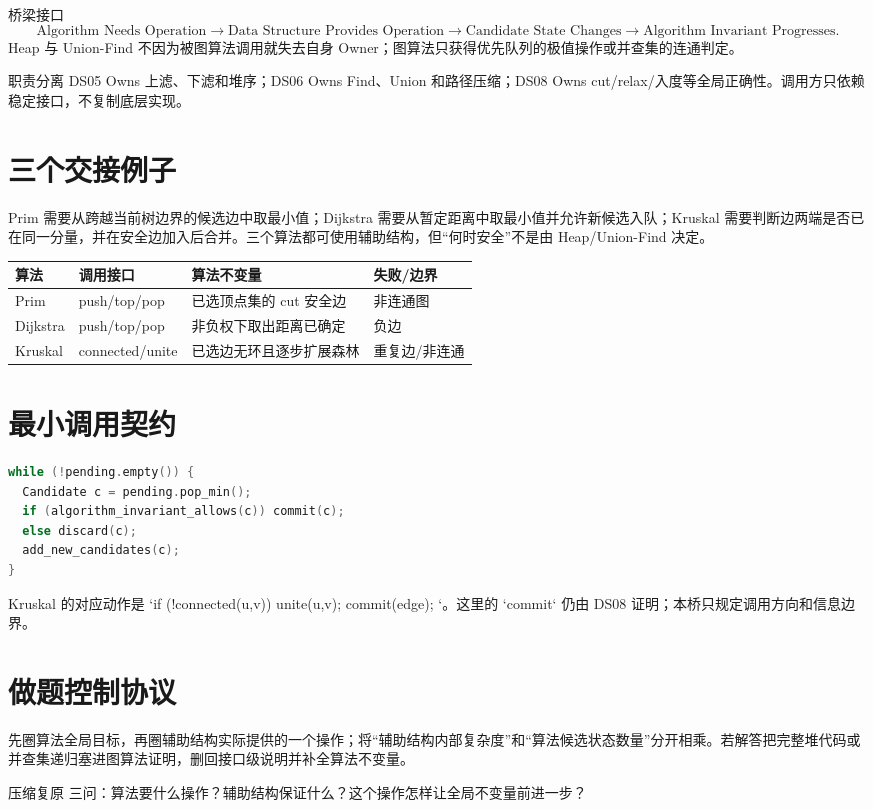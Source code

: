 \documentclass[UTF8,fontset=none,11pt,a4paper]{ctexart}
\begin{document}

\begin{corebox}{桥梁接口}
\[
\text{Algorithm Needs Operation}\to\text{Data Structure Provides Operation}\to\text{Candidate State Changes}\to\text{Algorithm Invariant Progresses}.
\]
Heap 与 Union-Find 不因为被图算法调用就失去自身 Owner；图算法只获得优先队列的极值操作或并查集的连通判定。
\end{corebox}
\begin{methodbox}{职责分离}
DS05 Owns 上滤、下滤和堆序；DS06 Owns Find、Union 和路径压缩；DS08 Owns cut/relax/入度等全局正确性。调用方只依赖稳定接口，不复制底层实现。
\end{methodbox}
\tableofcontents\newpage

\section{三个交接例子}
Prim 需要从跨越当前树边界的候选边中取最小值；Dijkstra 需要从暂定距离中取最小值并允许新候选入队；Kruskal 需要判断边两端是否已在同一分量，并在安全边加入后合并。三个算法都可使用辅助结构，但“何时安全”不是由 Heap/Union-Find 决定。

\begin{center}\small
\begin{tabularx}{\linewidth}{L{2.4cm}L{3.0cm}YY}\toprule
算法 & 调用接口 & 算法不变量 & 失败/边界\\\midrule
Prim & push/top/pop & 已选顶点集的 cut 安全边 & 非连通图\\
Dijkstra & push/top/pop & 非负权下取出距离已确定 & 负边\\
Kruskal & connected/unite & 已选边无环且逐步扩展森林 & 重复边/非连通\\\bottomrule\end{tabularx}\end{center}

\section{最小调用契约}
\begin{lstlisting}[language=C++]
while (!pending.empty()) {
  Candidate c = pending.pop_min();
  if (algorithm_invariant_allows(c)) commit(c);
  else discard(c);
  add_new_candidates(c);
}
\end{lstlisting}
Kruskal 的对应动作是 `if (!connected(u,v)) { unite(u,v); commit(edge); }`。这里的 `commit` 仍由 DS08 证明；本桥只规定调用方向和信息边界。

\section{做题控制协议}
先圈算法全局目标，再圈辅助结构实际提供的一个操作；将“辅助结构内部复杂度”和“算法候选状态数量”分开相乘。若解答把完整堆代码或并查集递归塞进图算法证明，删回接口级说明并补全算法不变量。
\begin{corebox}{压缩复原}
三问：算法要什么操作？辅助结构保证什么？这个操作怎样让全局不变量前进一步？
\end{corebox}
\end{document}
